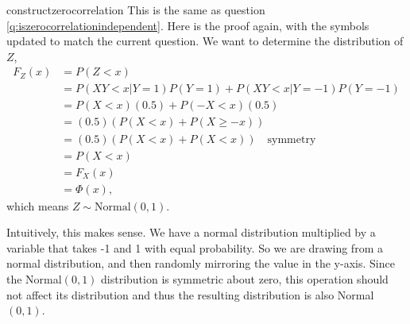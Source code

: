 \begin{answer}{constructzerocorrelation}
This is the same as question \ref{q:iszerocorrelationindependent}.
Here is the proof again, with the symbols updated to match the current question.
We want to determine the distribution of $Z$,
\begin{align*}
F_Z(x)  &= P(Z<x)  \\
&=
P( XY<x| Y = 1)P(Y=1) +
P( XY<x| Y = -1)P(Y=-1) \\
&=
P( X<x)(0.5) + P(-X<x)(0.5) \\
&=  (0.5)( P( X<x) + P(X \geq -x)) \\
&=  (0.5)( P( X<x) + P(X < x)) \quad \text{symmetry} \\
&=   P(X < x) \\
&=   F_X(x) \\
&=   \Phi(x)
\text{,}
\end{align*}
which means $Z \sim \text{Normal}(0, 1)$.

Intuitively, this makes sense.
We have a normal distribution multiplied by a variable that takes -1 and 1 with equal probability.
So we are drawing from a normal distribution, and then randomly mirroring the value in the y-axis.
Since the Normal$(0,1)$ distribution is symmetric about zero, this operation should not affect its distribution and thus the resulting distribution is also Normal$(0,1)$.


\end{answer}
